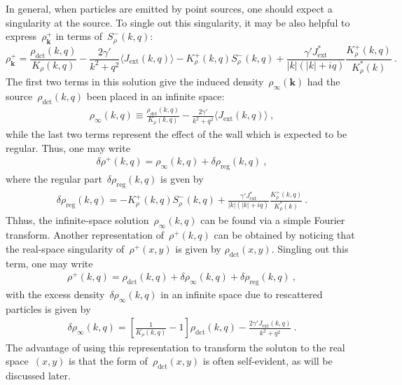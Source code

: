 \documentclass[preprint,aps,eqsecnum, prb]{revtex4-1}
\newcommand{\fplus}[1]{{#1}^{+}}
\newcommand{\fminus}[1]{{#1}^{-}}
\newcommand{\dct}[1]{{#1}_\mathrm{dct}}
\begin{document}
In general, when particles
are emitted by point sources, one should expect a singularity
at the source. To single out this singularity,
it may be also helpful to express~$\fplus{\rho}_{\bm k}$
in terms of~$\fminus{S}_\rho(k, q)$:
\begin{equation}
  \label{eq:solution-rho-plus}
  \fplus{\rho}_{\bm k} = \frac{\dct{\rho}(k, q)}{K_\rho(k, q)}
    - \frac{2 \gamma'}{k^2 + q^2} \langle J_\mathrm{ext}(k, q) \rangle
  - \fplus{K}_\rho(k, q) \fminus{S}_\rho(k, q)
  + \frac{\gamma' J_\mathrm{ext}^\ast}{|k|(|k| + iq)}
     \frac{\fplus{K}_\rho(k, q)}{K_\rho^\ast(k)}
  \  .
\end{equation}
The first two terms in this solution give the induced
density~$\rho_\infty({\bm k})$  had the source~$\dct{\rho}(k, q)$
been placed in an infinite space:
\begin{align}
\rho_\infty(k, q) \equiv \frac{\dct{\rho}(k, q)}{K_\rho(k, q)}
- \frac{2\gamma'}{k^2 + q^2} \langle J_\mathrm{ext}(k, q)\rangle\ ,
\end{align}
 while the last two terms represent
the effect of the wall which is expected to be regular.
Thus, one may write
\begin{align}
  \delta\fplus{\rho}(k, q) = \rho_{\infty}(k, q) + \delta\rho_\mathrm{reg}(k, q)
  \ ,
\end{align}
where the regular part~$\delta\rho_\mathrm{reg}(k, q)$ is gven by
\begin{align}
  \label{eq:rho-reg}
 \delta\rho_\mathrm{reg}(k, q) =
  - \fplus{K}_\rho(k, q)
\fminus{S}_\rho(k, q) + \frac{\gamma'J_\mathrm{ext}^\ast}{|k|(|k| + iq)}
\frac{\fplus{K}_\rho(k, q)}{K_\rho^\ast(k)}\ .
\end{align}
Thhus, the infinite-space solution~$\rho_\infty(k, q)$ can be found
via a simple Fourier transform.
Another representation of~$\fplus{\rho}(k, q)$ can be obtained by noticing that
the real-space singularity of~$\fplus{\rho}(x, y)$ is given by
$\dct{\rho}(x, y)$. Singling out this term, one may write
\begin{align}
  \label{eq:rho-decomp}
\fplus{\rho}(k, q) = \dct{\rho}(k, q)
 + \delta \rho_\infty(k, q) + \delta\rho_\mathrm{reg}(k, q)\ ,
\end{align}
with the excess density~$\delta\rho_\infty(k, q)$ in an infinite space
due to rescattered particles is given by
\begin{align}
  \label{eq:drho-inf}
\delta\rho_\infty(k, q) = \left[\frac{1}{K_\rho(k, q)} - 1\right]
\dct{\rho}(k, q)
- \frac{2\gamma' J_\mathrm{ext}(k, q)}{k^2 + q^2}\ .
\end{align}
The advantage of using this representation to transform the soluton
to the real space~$(x, y)$ is that the
form of~$\dct{\rho}(x, y)$ is often self-evident, as will be discussed
later.
\end{document}
